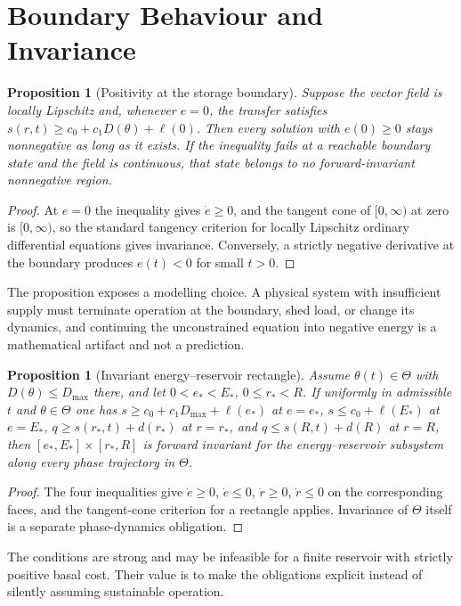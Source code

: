 \documentclass[11pt,notitlepage]{report}
\newtheorem{proposition}[theorem]{Proposition}
\theoremstyle{definition}
\theoremstyle{remark}
\begin{document}
\section{Boundary Behaviour and Invariance}
\begin{proposition}[Positivity at the storage boundary]\label{prop:positive}
Suppose the vector field is locally Lipschitz and, whenever $e=0$, the transfer satisfies $s(r,t)\ge c_0+c_1D(\theta)+\ell(0)$. Then every solution with $e(0)\ge0$ stays nonnegative as long as it exists. If the inequality fails at a reachable boundary state and the field is continuous, that state belongs to no forward-invariant nonnegative region.
\end{proposition}
\begin{proof}
At $e=0$ the inequality gives $\dot e\ge0$, and the tangent cone of $[0,\infty)$ at zero is $[0,\infty)$, so the standard tangency criterion for locally Lipschitz ordinary differential equations gives invariance. Conversely, a strictly negative derivative at the boundary produces $e(t)<0$ for small $t>0$.
\end{proof}
The proposition exposes a modelling choice. A physical system with insufficient supply must terminate operation at the boundary, shed load, or change its dynamics, and continuing the unconstrained equation into negative energy is a mathematical artifact and not a prediction.

\begin{proposition}[Invariant energy--reservoir rectangle]\label{prop:rectangle}
Assume $\theta(t)\in\Theta$ with $D(\theta)\le D_{\max}$ there, and let $0<e_*<E_*$, $0\le r_*<R$. If uniformly in admissible $t$ and $\theta\in\Theta$ one has $s\ge c_0+c_1D_{\max}+\ell(e_*)$ at $e=e_*$, $s\le c_0+\ell(E_*)$ at $e=E_*$, $q\ge s(r_*,t)+d(r_*)$ at $r=r_*$, and $q\le s(R,t)+d(R)$ at $r=R$, then $[e_*,E_*]\times[r_*,R]$ is forward invariant for the energy--reservoir subsystem along every phase trajectory in $\Theta$.
\end{proposition}
\begin{proof}
The four inequalities give $\dot e\ge0$, $\dot e\le0$, $\dot r\ge0$, $\dot r\le0$ on the corresponding faces, and the tangent-cone criterion for a rectangle applies. Invariance of $\Theta$ itself is a separate phase-dynamics obligation.
\end{proof}
The conditions are strong and may be infeasible for a finite reservoir with strictly positive basal cost. Their value is to make the obligations explicit instead of silently assuming sustainable operation.
\end{document}
